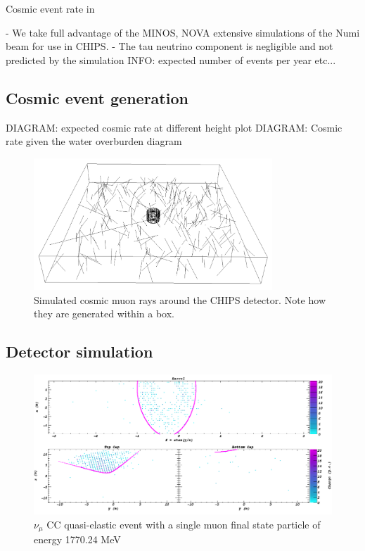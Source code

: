Cosmic event rate in \cite{son2013}

- We take full advantage of the MINOS, NOVA extensive simulations of the Numi beam for use in
CHIPS.
- The tau neutrino component is negligible and not predicted by the simulation
INFO: expected number of events per year etc...

\subsection{Cosmic event generation} %
\label{sec:chips_monte_carlo_cosmic} %

DIAGRAM: expected cosmic rate at different height plot
DIAGRAM: Cosmic rate given the water overburden diagram

\begin{figure} %
    \includegraphics[width=0.8\textwidth]{diagrams/4-chips/cosmics.png}
    \caption[Cosmic muon rays around the CHIPS detector]
    {Simulated cosmic muon rays around the CHIPS detector. Note how they are generated within a
        box.}
    \label{fig:cosmics}
\end{figure}

\subsection{Detector simulation} %
\label{sec:chips_monte_carlo_sim} %

\begin{figure} %
    \includegraphics[width=\textwidth]{diagrams/4-chips/sim_event.png}
    \caption[sim event short]
    {$\nu_{\mu}$ CC quasi-elastic event with a single muon final state particle of energy
        1770.24 MeV}
    \label{fig:sim_event}
\end{figure}

